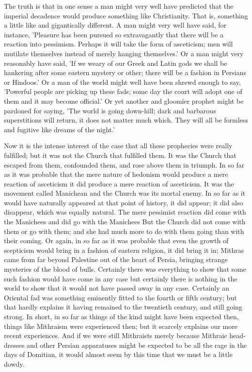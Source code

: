 The truth is that in one sense a man might very well have predicted that the imperial decadence would produce something like Christianity. That is, something a little like and gigantically different. A man might very well have said, for instance, 'Pleasure has been pursued so extravagantly that there will be a reaction into pessimism. Perhaps it will take the form of asceticism; men will mutilate themselves instead of merely hanging themselves.' Or a man might very reasonably have said, 'If we weary of our Greek and Latin gods we shall be hankering after some eastern mystery or other; there will be a fashion in Persians or Hindoos.' Or a man of the world might well have been shrewd enough to say, 'Powerful people are picking up these fads; some day the court will adopt one of them and it may become official.' Or yet another and gloomier prophet might be pardoned for saying, 'The world is going down-hill; dark and barbarous superstitions will return, it does not matter much which. They will all be formless and fugitive like dreams of the night.'

Now it is the intense interest of the case that all these prophecies were really fulfilled; but it was not the Church that fulfilled them. It was the Church that escaped from them, confounded them, and rose above them in triumph. In so far as it was probable that the mere nature of hedonism would produce a mere reaction of asceticism it did produce a mere reaction of asceticism. It was the movement called Manichean and the Church was its mortal enemy. In so far as it would have naturally appeared at that point of history, it did appear; it did also disappear, which was equally natural. The mere pessimist reaction did come with the Manichees and did go with the Manichees But the Church did not come with them or go with them; and she had much more to do with them going than with their coming. Or again, in so far as it was probable that even the growth of scepticism would bring in a fashion of eastern religion, it did bring it in; Mithras came from far beyond Palestine out of the heart of Persia, bringing strange mysteries of the blood of bulls. Certainly there was everything to show that some such fashion would have come in any case but certainly there is nothing in the world to show that it would not have passed away in any case. Certainly an Oriental fad was something eminently fitted to the fourth or fifth century; but that hardly explains it having remained to the twentieth century, and still going strong. In short, in so far as things of the kind might have been expected then, things like Mithraism were experienced then; but it scarcely explains our more recent experiences. And if we were still Mithraists merely because Mithraic head-dresses and other Persian apparatuses might be expected to be all the rage in the days of Domitian, it would almost seem by this time that we must be a little dowdy.

